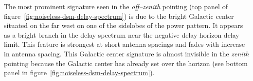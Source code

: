 \documentclass[preprint2,iop,numberedappendix]{emulateapj}
\begin{document}
The most prominent signature seen in the {\it off--zenith} pointing (top panel of figure~\ref{fig:noiseless-dsm-delay-spectrum}) is due to the bright Galactic center situated on the far west on one of the sidelobes of the power pattern. It appears as a bright branch in the delay spectrum near the negative delay horizon delay limit. This feature is strongest at short antenna spacings and fades with increase in antenna spacing. This Galactic center signature is almost invisible in the {\it zenith} pointing because the Galactic center has already set over the horizon (see bottom panel in figure~\ref{fig:noiseless-dsm-delay-spectrum}). 


\end{document}
